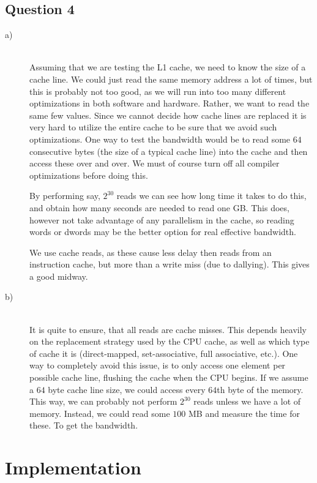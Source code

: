 \documentclass[a4paper,final]{article}
\begin{document}
\subsection*{Question 4}
\begin{description}
\item [a)]\ \\
    Assuming that we are testing the L1 cache, we need to know the size of a
    cache line. We could just read the same memory address a lot of times, but
    this is probably not too good, as we will run into too many different
    optimizations in both software and hardware. Rather, we want to read the
    same few values. Since we cannot decide how cache lines are replaced it
    is very hard to utilize the entire cache to be sure that we avoid such
    optimizations. One way to test the bandwidth would be to read some $64$
    consecutive bytes (the size of a typical cache line) into the cache and
    then access these over and over. We must of course turn off all compiler
    optimizations before doing this.

    By performing say, $2^{30}$ reads we can see how long time it takes to do
    this, and obtain how many seconds are needed to read one GB\@. This does,
    however not take advantage of any parallelism in the cache, so reading
    words or dwords may be the better option for real effective bandwidth.

    We use cache reads, as these cause less delay then reads from an
    instruction cache, but more than a write miss (due to dallying). This
    gives a good midway.
\item [b)]\ \\
    It is quite to ensure, that all reads are cache misses. This depends
    heavily on the replacement strategy used by the CPU cache, as well as which
    type of cache it is (direct-mapped, set-associative, full associative,
    etc.). One way to completely avoid this issue, is to only access one
    element per possible cache line, flushing the cache when the CPU begins.
    If we assume a $64$ byte cache line size, we could access every $64$th
    byte of the memory. This way, we can probably not perform $2^{30}$ reads
    unless we have a lot of memory. Instead, we could read some $100$ MB and
    measure the time for these. To get the bandwidth.
\end{description}


\section{Implementation}
\end{document}
